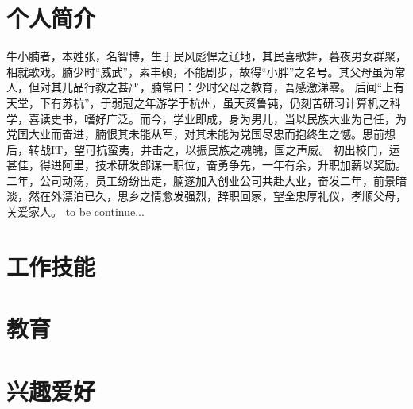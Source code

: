\documentclass[12pt,a4paper]{moderncv}
\begin{document}
\section{个人简介}
\cvitem{}
{牛小腩者，本姓张，名智博，生于民风彪悍之辽地，其民喜歌舞，暮夜男女群聚，相就歌戏。腩少时“威武”，素丰硕，不能剧步，故得“小胖”之名号。其父母虽为常人，但对其儿品行教之甚严，腩常曰：少时父母之教育，吾感激涕零。}
\cvitem{}
{后闻“上有天堂，下有苏杭”，于弱冠之年游学于杭州，虽天资鲁钝，仍刻苦研习计算机之科学，喜读史书，嗜好广泛。而今，学业即成，身为男儿，当以民族大业为己任，为党国大业而奋进，腩恨其未能从军，对其未能为党国尽忠而抱终生之憾。思前想后，转战IT，望可抗蛮夷，并击之，以振民族之魂魄，国之声威。}
\cvitem{}
{初出校门，运甚佳，得进阿里，技术研发部谋一职位，奋勇争先，一年有余，升职加薪以奖励。二年，公司动荡，员工纷纷出走，腩遂加入创业公司共赴大业，奋发二年，前景暗淡，然在外漂泊已久，思乡之情愈发强烈，辞职回家，望全忠厚礼仪，孝顺父母，关爱家人。}
\cvitem{}
{to be continue...}

\section{工作技能}

\section{教育}

\section{兴趣爱好}


\renewcommand{\baselinestretch}{1.0}

\closesection{}                   %
\renewcommand{\listitemsymbol}{-} %
\end{document}
